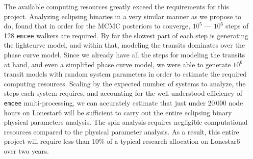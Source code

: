 The available computing resources greatly exceed the requirements for this
project. Analyzing \kepler{} eclipsing binaries in a very similar manner as we
propose to do, \citep{Windemuth_et_al_19} found that in order for the MCMC
posteriors to converge, $10^5$ --- $10^6$ steps of 128 \texttt{emcee} walkers
are required. By far the slowest part of each step is generating the lightcurve
model, and within that, modeling the transits dominates over the phase curve
model. Since we already have all the steps for modeling the transits at hand,
and even a simplified phase curve model, we were able to generate $10^6$ transit
models with random system parameters in order to estimate the required computing
resources. Scaling by the expected number of systems to analyze, the steps each
system requires, and accounting for the well understood efficiency of
\texttt{emcee} multi-processing, we can accurately estimate that just under
20\,000 node hours on Lonestar6 will be sufficient to carry out the entire
eclipsing binary physical parameters analysis. The spin analysis requires
negligible computational resources compared to the physical parameter analysis.
As a result, this entire project will require less than 10\% of a typical
research allocation on Lonestar6 over two years.
